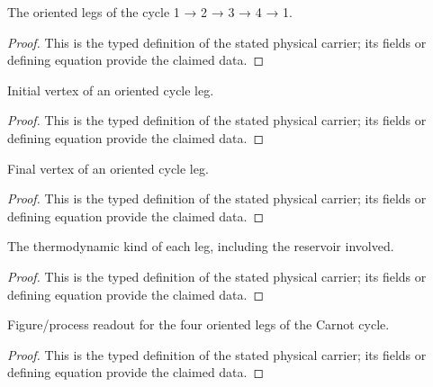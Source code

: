 \begin{definition}
  \label{def:physics:IPhO_2026_3_C_2:aux016}
  The oriented legs of the cycle 1 → 2 → 3 → 4 → 1.
\end{definition}
\begin{proof}
  This is the typed definition of the stated physical carrier; its fields or defining equation provide the claimed data.
\end{proof}

\begin{definition}
  \label{def:physics:IPhO_2026_3_C_2:aux017}
  Initial vertex of an oriented cycle leg.
\end{definition}
\begin{proof}
  This is the typed definition of the stated physical carrier; its fields or defining equation provide the claimed data.
\end{proof}

\begin{definition}
  \label{def:physics:IPhO_2026_3_C_2:aux018}
  Final vertex of an oriented cycle leg.
\end{definition}
\begin{proof}
  This is the typed definition of the stated physical carrier; its fields or defining equation provide the claimed data.
\end{proof}

\begin{definition}
  \label{def:physics:IPhO_2026_3_C_2:aux019}
  The thermodynamic kind of each leg, including the reservoir involved.
\end{definition}
\begin{proof}
  This is the typed definition of the stated physical carrier; its fields or defining equation provide the claimed data.
\end{proof}

\begin{definition}
  \label{def:physics:IPhO_2026_3_C_2:aux020}
  Figure/process readout for the four oriented legs of the Carnot cycle.
\end{definition}
\begin{proof}
  This is the typed definition of the stated physical carrier; its fields or defining equation provide the claimed data.
\end{proof}

